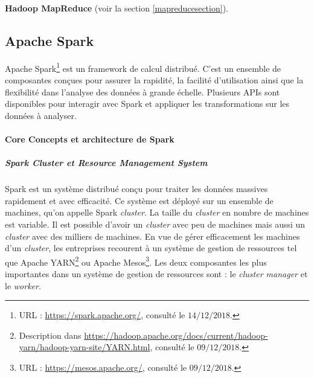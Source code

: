 \textbf{Hadoop MapReduce} (voir la section \ref{mapreducesection}).










\subsection{Apache Spark } \label{apache-spark}


Apache Spark\footnote{URL : \url{https://spark.apache.org/}, consulté le $14/12/2018$.} 
est un framework de calcul distribué. C'est un ensemble de composantes conçues pour assurer la rapidité, la facilité d'utilisation ainsi que la flexibilité dans l'analyse des données à grande échelle. Plusieurs APIs sont disponibles pour interagir avec Spark et 
 appliquer les transformations sur les données à analyser. 

\paragraph{Core Concepts et architecture de Spark}

\subparagraph{Spark Cluster et Resource Management System}

Spark est un système distribué conçu pour traiter les données massives rapidement et avec efficacité. Ce système est déployé sur un ensemble de machines, qu'on appelle Spark \textit{cluster}. La taille du \textit{cluster} en nombre de machines est variable. Il est possible d'avoir un \textit{cluster} avec peu de machines mais aussi un \textit{cluster} avec des milliers de machines. En vue de gérer efficacement les machines d'un \textit{cluster}, les entreprises recourent à un système de gestion de ressources tel que Apache YARN\footnote{Description dans \url{https://hadoop.apache.org/docs/current/hadoop-yarn/hadoop-yarn-site/YARN.html}, consulté le $09/12/2018$.} ou Apache Mesos\footnote{URL : \url{https://mesos.apache.org/}, consulté le $09/12/2018$.}. Les deux composantes les plus importantes dans un système de gestion de ressources sont : le \textit{cluster manager} et le \textit{worker}.

